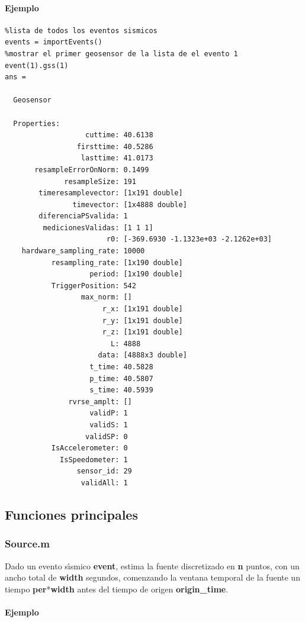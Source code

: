 \paragraph{Ejemplo}
\begin{verbatim}
%lista de todos los eventos sismicos
events = importEvents()
%mostrar el primer geosensor de la lista de el evento 1
event(1).gss(1)
ans = 

  Geosensor

  Properties:
                   cuttime: 40.6138
                 firsttime: 40.5286
                  lasttime: 41.0173
       resampleErrorOnNorm: 0.1499
              resampleSize: 191
        timeresamplevector: [1x191 double]
                timevector: [1x4888 double]
        diferenciaPSvalida: 1
         medicionesValidas: [1 1 1]
                        r0: [-369.6930 -1.1323e+03 -2.1262e+03]
    hardware_sampling_rate: 10000
           resampling_rate: [1x190 double]
                    period: [1x190 double]
           TriggerPosition: 542
                  max_norm: []
                       r_x: [1x191 double]
                       r_y: [1x191 double]
                       r_z: [1x191 double]
                         L: 4888
                      data: [4888x3 double]
                    t_time: 40.5828
                    p_time: 40.5807
                    s_time: 40.5939
               rvrse_amplt: []
                    validP: 1
                    validS: 1
                   validSP: 0
           IsAccelerometer: 0
             IsSpeedometer: 1
                 sensor_id: 29
                  validAll: 1
\end{verbatim}

\subsection{Funciones principales}

\subsubsection{Source.m} 

Dado un evento s\'{\i}smico \textbf{event}, estima la fuente discretizado en \textbf{n}
puntos, con un ancho total de \textbf{width} segundos, comenzando la ventana temporal
de la fuente un tiempo \textbf{per}*\textbf{width} antes del tiempo de origen \textbf{origin\_time}.
\paragraph{Ejemplo}


